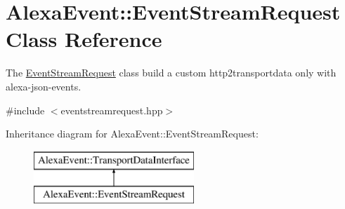 \hypertarget{classAlexaEvent_1_1EventStreamRequest}{}\section{Alexa\+Event\+:\+:Event\+Stream\+Request Class Reference}
\label{classAlexaEvent_1_1EventStreamRequest}


The \hyperlink{classAlexaEvent_1_1EventStreamRequest}{Event\+Stream\+Request} class build a custom http2transportdata only with alexa-\/json-\/events.  




{\ttfamily \#include $<$eventstreamrequest.\+hpp$>$}

Inheritance diagram for Alexa\+Event\+:\+:Event\+Stream\+Request\+:\begin{figure}[H]
\begin{center}
\leavevmode
\includegraphics[height=2.000000cm]{d4/dd0/classAlexaEvent_1_1EventStreamRequest}
\end{center}
\end{figure}

